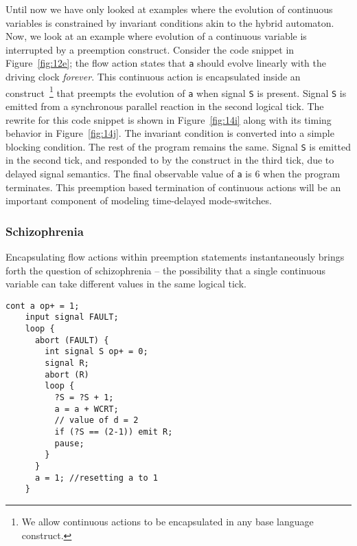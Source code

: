 \documentclass[10pt,journal,cspaper,compsoc]{IEEEtran}
\begin{document}
Until now we have only looked at examples where the evolution of
continuous variables is constrained by invariant conditions akin to the
hybrid automaton. Now, we look at an example where evolution of a
continuous variable is interrupted by a preemption construct. Consider
the code snippet in Figure~\ref{fig:12e}; the flow action states that
\texttt{a} should evolve linearly with the driving clock
\textit{forever}. This continuous action is encapsulated inside an
 construct~\footnote{We allow continuous actions to be
  encapsulated in any base language construct.} that preempts the
evolution of \texttt{a} when signal \texttt{S} is present. Signal
\texttt{S} is emitted from a synchronous parallel reaction in the second
logical tick. The rewrite for this code snippet is shown in
Figure~\ref{fig:14i} along with its timing behavior in
Figure~\ref{fig:14j}. The  invariant condition is
converted into a simple \mbox{ } blocking
condition. The rest of the program remains the same. Signal \texttt{S}
is emitted in the second tick, and responded to by the 
construct in the third tick, due to delayed signal semantics. The final
observable value of \texttt{a} is 6 when the program terminates. This
preemption based termination of continuous actions will be an important
component of modeling time-delayed mode-switches.

\subsubsection{Schizophrenia}
\label{sec:schizophrenia}

Encapsulating flow actions within preemption statements instantaneously
brings forth the question of schizophrenia -- the possibility that a
single continuous variable can take different values in the same logical
tick.

\newbox{\schtwo}
\begin{lrbox}{\schtwo}
  \begin{lstlisting}[mathescape,style=sysj,morekeywords={until,wait_inbetween,
      cont,signal,loop,abort,await,emit,present,trap,pause,exit,delay,suspend}]
    cont a op+ = 1;
    input signal FAULT;
    loop {
      abort (FAULT) {
        int signal S op+ = 0;
        signal R;
        abort (R) 
        loop {
          ?S = ?S + 1;
          a = a + WCRT;
          // value of d = 2
          if (?S == (2-1)) emit R;
          pause;
        }
      }
      a = 1; //resetting a to 1
    }
  \end{lstlisting}
\end{lrbox}
\end{document}
